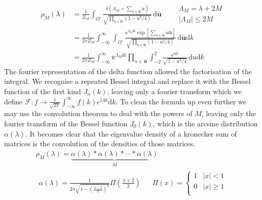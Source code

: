 \documentclass{article}[12pt]
\numberwithin{equation}{section}
\begin{document}
\begin{align*}
  \rho_M(\lambda)&=\frac{1}{Z_M}
  \int_{\Omega'}\!
  \frac{\delta(\Lambda_M+\sum_{u\in\bar{\mathbf{u}}}u)}
  {\sqrt{\prod_{u\in\bar{\mathbf{u}}}(1-u^2/4) }}
  \,\mathrm{d}\bar{\mathbf{u}}
  \qquad
  \begin{matrix}
    \Lambda_M=\lambda+2M \\
    |\Lambda_M|\leq2M
  \end{matrix}\\
  &=\frac{1}{2\pi Z_M}
  \int_{-\infty}^{\infty}\int_{\Omega'}\!
  \frac{\mathbb{e}^{\Lambda_M\mathbb{i}k}\exp[\sum_{u\in\bar{\mathbf{u}}}u\mathbb{i}k]}
  {\sqrt{\prod_{u\in\bar{\mathbf{u}}}(1-u^2/4) }}
  \,\mathrm{d}\bar{\mathbf{u}}\mathrm{d}k\\
  &=\frac{1}{2\pi Z_M}
  \int_{-\infty}^{\infty}\mathbb{e}^{\Lambda_M\mathbb{i}k}
  \prod_{u\in\bar{\mathbf{u}}}\int_{-2}^{2}\!
  \frac{\mathbb{e}^{u\mathbb{i}k}}
  {\sqrt{1-u^2/4}}
  \,\mathrm{d}u\mathrm{d}k
\end{align*}
The fourier representation of the delta function allowed the
factorisation of the integral. We recognise a repeated Bessel
integral and replace it with the Bessel function of the first kind
$J_n(k)$, leaving only a fourier transform which we define
$ \mathcal{F} :
f\rightarrow \frac{1}{\sqrt{2\pi}}
\int_{-\infty}^{\infty}f(k)e^{\mathbb{i}\Lambda k}\mathrm{d}k$. To clean
the formula up even further we may use the convolution
theorem to deal with the powers of $M$, leaving only the fourier
transform of the Bessel function $J_0(k)$, which is the arcsine
distribution $\alpha(\lambda)$. It becomes clear that the eigenvalue
density of a kronecker sum of matrices is the convolution of the densities
of those matrices.
\begin{align}
  \rho_M(\lambda)=\underbrace{
  \alpha(\lambda)*\alpha(\lambda)*\cdots*\alpha(\lambda)}_{M}\qquad\qquad\qquad\\
  \begin{matrix}
    \alpha(\lambda)=
      \frac{1}{2\pi\sqrt{1-\left(\frac{\lambda+2}{2}\right)^2}}
      \Pi\left(\frac{\lambda+2}{2}\right)
    &&
    \Pi(x)=
      \begin{cases}
        1 & |x|<1\\
        0 & |x|\geq1\\
      \end{cases}
  \end{matrix}
\end{align}
\end{document}

